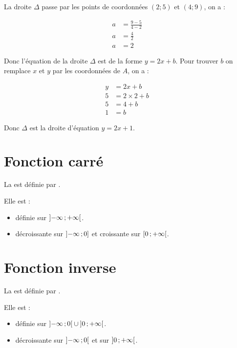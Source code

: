 \documentclass[12pt,a4paper]{article}
\begin{document}
	\begin{myex}
		La droite $\Delta$ passe par les points de coordonnées $(2;5)$ et $(4;9)$, on a :
		
		\begin{align*}
		a &= \frac{9-5}{4-2} \\
		a &= \frac{4}{2} \\
		a &= 2
		\end{align*}
		
		Donc l'équation de la droite $\Delta$ est de la forme $y=2x+b$. Pour trouver $b$ on remplace $x$ et $y$ par les coordonnées de $A$, on a :
		
		\begin{align*}
		y &= 2x+b \\
		5 &= 2 \times 2 + b  \\
		5 &= 4 + b\\
		1 &= b
		\end{align*}
		
		Donc $\Delta$ est la droite d'équation $y=2x+1$.
	\end{myex}
\section{Fonction carré}
	
	\begin{mybilan}
		La  est définie par .
		
		Elle est :
		\begin{itemize}
			\item définie sur $\mbox{\ensuremath{\left]- \infty \mathpunct{};+ \infty\right[}}$.
			\item décroissante sur $\mbox{\ensuremath{\left]- \infty\mathpunct{};0\right]}}$ et croissante sur $\mbox{\ensuremath{\left[0\mathpunct{};+ \infty\right[}}$.
		\end{itemize}
	\end{mybilan}
	
	
	
	
	\section{Fonction inverse}
	
	\begin{mybilan}
		La  est définie par \kw{$x \mapsto \dfrac{1}{x}$}.			
		
		Elle est :
		\begin{itemize}
			\item définie sur $\mbox{\ensuremath{\left]-\infty\mathpunct{};0\right[}} \cup \mbox{\ensuremath{\left]0\mathpunct{};+\infty\right[}}$.
			\item décroissante sur $\mbox{\ensuremath{\left]- \infty\mathpunct{};0\right[}}$ et sur $\mbox{\ensuremath{\left]0\mathpunct{};+ \infty\right[}}$. 
		\end{itemize}
	\end{mybilan}
	
\end{document}
